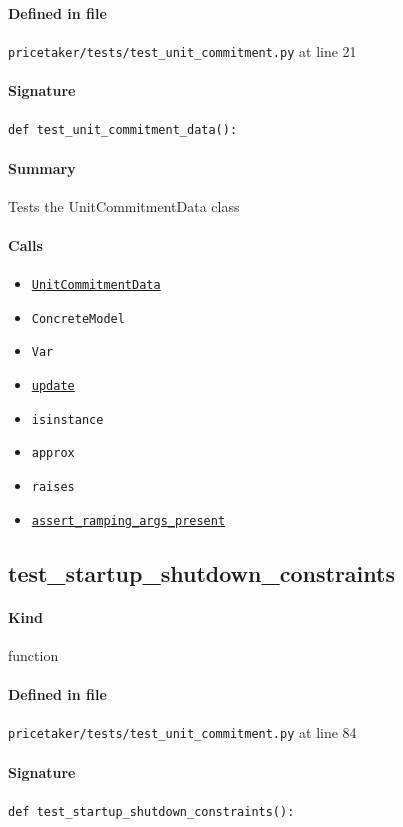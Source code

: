 \documentclass[11pt]{report}
\begin{document}
\paragraph{Defined in file} \texttt{pricetaker/tests/test\_unit\_commitment.py} at line 21
\paragraph{Signature} \texttt{def test\_unit\_commitment\_data():}
\paragraph{Summary} Tests the UnitCommitmentData class
\paragraph{Calls}
\begin{itemize}[leftmargin=*]
  \item \hyperref[def:pricetaker-unit_commitment.py:UnitCommitmentData:L26]{\texttt{UnitCommitmentData}}
  \item \texttt{ConcreteModel}
  \item \texttt{Var}
  \item \hyperref[def:pricetaker-unit_commitment.py:UnitCommitmentData.update:L84]{\texttt{update}}
  \item \texttt{isinstance}
  \item \texttt{approx}
  \item \texttt{raises}
  \item \hyperref[def:pricetaker-unit_commitment.py:UnitCommitmentData.assert_ramping_args_present:L116]{\texttt{assert\_ramping\_args\_present}}
\end{itemize}
\subsection{test\_startup\_shutdown\_constraints}
\label{def:pricetaker-tests-test_unit_commitment.py:test_startup_shutdown_constraints:L84}
\paragraph{Kind} function
\paragraph{Defined in file} \texttt{pricetaker/tests/test\_unit\_commitment.py} at line 84
\paragraph{Signature} \texttt{def test\_startup\_shutdown\_constraints():}
\end{document}
